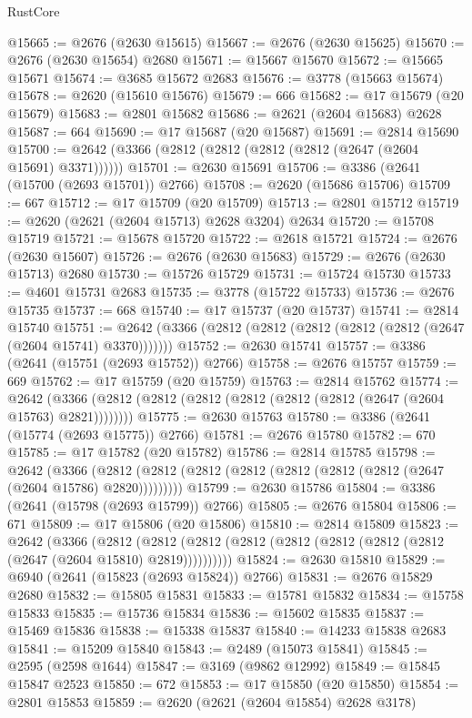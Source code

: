 \begin{lexlean}{RustCore}
\begin{coremodule}
@15665 := @2676 (@2630 @15615)
@15667 := @2676 (@2630 @15625)
@15670 := @2676 (@2630 @15654) @2680
@15671 := @15667 @15670
@15672 := @15665 @15671
@15674 := @3685 @15672 @2683
@15676 := @3778 (@15663 @15674)
@15678 := @2620 (@15610 @15676)
@15679 := 666
@15682 := @17 @15679 (@20 @15679)
@15683 := @2801 @15682
@15686 := @2621 (@2604 @15683) @2628
@15687 := 664
@15690 := @17 @15687 (@20 @15687)
@15691 := @2814 @15690
@15700 := @2642 (@3366 (@2812 (@2812 (@2812 (@2812 (@2647 (@2604 @15691) @3371))))))
@15701 := @2630 @15691
@15706 := @3386 (@2641 (@15700 (@2693 @15701)) @2766)
@15708 := @2620 (@15686 @15706)
@15709 := 667
@15712 := @17 @15709 (@20 @15709)
@15713 := @2801 @15712
@15719 := @2620 (@2621 (@2604 @15713) @2628 @3204) @2634
@15720 := @15708 @15719
@15721 := @15678 @15720
@15722 := @2618 @15721
@15724 := @2676 (@2630 @15607)
@15726 := @2676 (@2630 @15683)
@15729 := @2676 (@2630 @15713) @2680
@15730 := @15726 @15729
@15731 := @15724 @15730
@15733 := @4601 @15731 @2683
@15735 := @3778 (@15722 @15733)
@15736 := @2676 @15735
@15737 := 668
@15740 := @17 @15737 (@20 @15737)
@15741 := @2814 @15740
@15751 := @2642 (@3366 (@2812 (@2812 (@2812 (@2812 (@2812 (@2647 (@2604 @15741) @3370)))))))
@15752 := @2630 @15741
@15757 := @3386 (@2641 (@15751 (@2693 @15752)) @2766)
@15758 := @2676 @15757
@15759 := 669
@15762 := @17 @15759 (@20 @15759)
@15763 := @2814 @15762
@15774 := @2642 (@3366 (@2812 (@2812 (@2812 (@2812 (@2812 (@2812 (@2647 (@2604 @15763) @2821))))))))
@15775 := @2630 @15763
@15780 := @3386 (@2641 (@15774 (@2693 @15775)) @2766)
@15781 := @2676 @15780
@15782 := 670
@15785 := @17 @15782 (@20 @15782)
@15786 := @2814 @15785
@15798 := @2642
    (@3366 (@2812 (@2812 (@2812 (@2812 (@2812 (@2812 (@2812 (@2647 (@2604 @15786) @2820)))))))))
@15799 := @2630 @15786
@15804 := @3386 (@2641 (@15798 (@2693 @15799)) @2766)
@15805 := @2676 @15804
@15806 := 671
@15809 := @17 @15806 (@20 @15806)
@15810 := @2814 @15809
@15823 := @2642
    (@3366
      (@2812 (@2812 (@2812 (@2812 (@2812 (@2812 (@2812 (@2812 (@2647 (@2604 @15810) @2819))))))))))
@15824 := @2630 @15810
@15829 := @6940 (@2641 (@15823 (@2693 @15824)) @2766)
@15831 := @2676 @15829 @2680
@15832 := @15805 @15831
@15833 := @15781 @15832
@15834 := @15758 @15833
@15835 := @15736 @15834
@15836 := @15602 @15835
@15837 := @15469 @15836
@15838 := @15338 @15837
@15840 := @14233 @15838 @2683
@15841 := @15209 @15840
@15843 := @2489 (@15073 @15841)
@15845 := @2595 (@2598 @1644)
@15847 := @3169 (@9862 @12992)
@15849 := @15845 @15847 @2523
@15850 := 672
@15853 := @17 @15850 (@20 @15850)
@15854 := @2801 @15853
@15859 := @2620 (@2621 (@2604 @15854) @2628 @3178)

\end{coremodule}
\end{lexlean}
